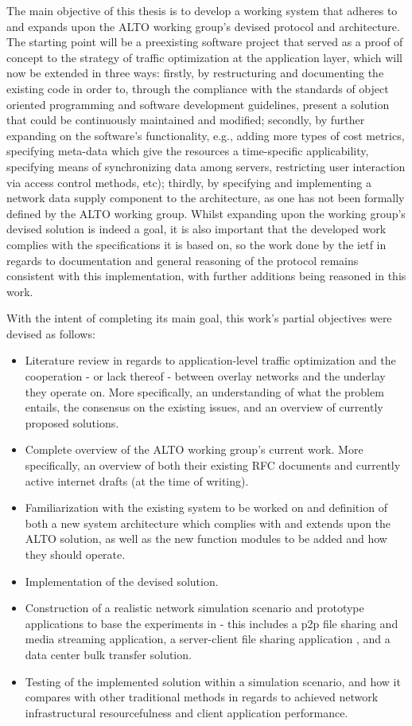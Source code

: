     The main objective of this thesis is to develop a working system that adheres to and expands upon the ALTO working group's devised protocol and architecture.
    The starting point will be a preexisting software project that served as a proof of concept to the strategy of traffic optimization at the application layer, which will now be extended in three ways: firstly, by restructuring and documenting the existing code in order to, through the compliance with the standards of object oriented programming and software development guidelines, present a solution that could be continuously maintained and modified; secondly, by further expanding on the software's functionality, e.g., adding more types of cost metrics, specifying meta-data which give the resources a time-specific applicability, specifying means of synchronizing data among servers, restricting user interaction via access control methods, etc); thirdly, by specifying and implementing a network data supply component to the architecture, as one has not been formally defined by the ALTO working group.
    Whilst expanding upon the working group's devised solution is indeed a goal, it is also important that the developed work complies with the specifications it is based on, so the work done by the \gls{ietf} in regards to documentation and general reasoning of the protocol remains consistent with this implementation, with further additions being reasoned in this work.

    With the intent of completing its main goal, this work's partial objectives were devised as follows:

\begin{itemize}
    \item Literature review in regards to application-level traffic optimization and the cooperation - or lack thereof - between overlay networks and the underlay they operate on.
        More specifically, an understanding of what the problem entails, the consensus on the existing issues, and an overview of currently proposed solutions.
    \item Complete overview of the ALTO working group's current work.
        More specifically, an overview of both their existing RFC documents and currently active internet drafts (at the time of writing).
    \item Familiarization with the existing system to be worked on and definition of both a new system architecture which complies with and extends upon the ALTO solution, as well as the new function modules to be added and how they should operate.
    \item Implementation of the devised solution.
    \item Construction of a realistic network simulation scenario and prototype applications to base the experiments in - this includes a \gls{p2p} file sharing and media streaming application, a server-client file sharing application , and a data center bulk transfer solution.
    \item Testing of the implemented solution within a simulation scenario, and how it compares with other traditional methods in regards to achieved network infrastructural resourcefulness and client application performance.
\end{itemize}

